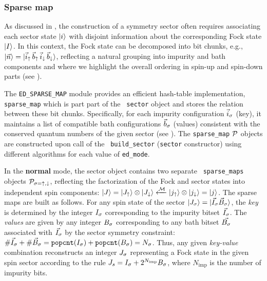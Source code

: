 \documentclass[edipack2.tex]{subfiles}
\begin{document}

\subsubsection{Sparse map}\label{CodeSparseMap}
As discussed in , the construction of a symmetry 
sector often requires associating each sector state $|i\rangle$ with 
disjoint information about the corresponding Fock state $|I\rangle$. 
In this context, the Fock state can be decomposed into bit chunks, 
e.g., $|\vec{n}\rangle = |\vec{i}_\uparrow\,\vec{b}_\uparrow\,
\vec{i}_\downarrow\,\vec{b}_\downarrow\rangle$, reflecting a natural grouping into impurity 
and bath components and where we highlight the overall ordering in
spin-up and spin-down parts (see ).

The {\tt ED\_SPARSE\_MAP} module provides an efficient hash-table 
implementation, {\tt sparse\_map} which is part part of the {\tt
  sector} object and stores the relation between these bit chunks. 
Specifically, for each impurity configuration 
$\vec{i}_\sigma$ (key), it maintains a list of compatible bath 
configurations $\vec{b}_\sigma$ (values) consistent with the conserved 
quantum numbers of the given sector (see ).
The {\tt sparse\_map} ${\cal P}$ objects are constructed upon call of the {\tt
  build\_sector} ({\tt sector} constructor) using different algorithms 
for each value of {\tt ed\_mode}.

In the {\bf normal} mode, the sector object contains two separate {\tt
  sparse\_maps} objects ${\cal P}_{\sigma=\uparrow,\downarrow}$, reflecting the
factorization of the Fock and sector states into independent spin components: 
$|J\rangle=|J_\uparrow\rangle\otimes|J_\downarrow\rangle \xleftarrow{{\cal M}}
|j_\uparrow\rangle\otimes|j_\downarrow\rangle=|j\rangle$.
The sparse maps are built as follows. 
For any spin state of the sector $|J_\sigma\rangle=|{\vec{I}_{\sigma}\vec{B}_{\sigma}}\rangle$,
the \emph{key} is determined by the integer $I_\sigma$ corresponding to the
impurity bitset $\vec{I}_\sigma$. The \emph{values} are given by any
integer $B_\sigma$ corresponding to any bath bitset
$\vec{B_\sigma}$ associated with $\vec{I}_\sigma$ by the sector symmetry constraint: $\#\vec{I}_\sigma + \#\vec{B}_\sigma = \mathtt{popcnt}(I_\sigma) + \mathtt{popcnt}(B_\sigma)= N_\sigma$.
Thus, any given \emph{key-value} combination 
reconstructs an integer $J_\sigma$ representing a Fock state in the
given spin sector according to the rule $J_s = I_\sigma +
2^{N_\mathrm{imp}}B_\sigma$, where $N_\mathrm{imp}$ is the number of impurity bits. 
\end{document}
